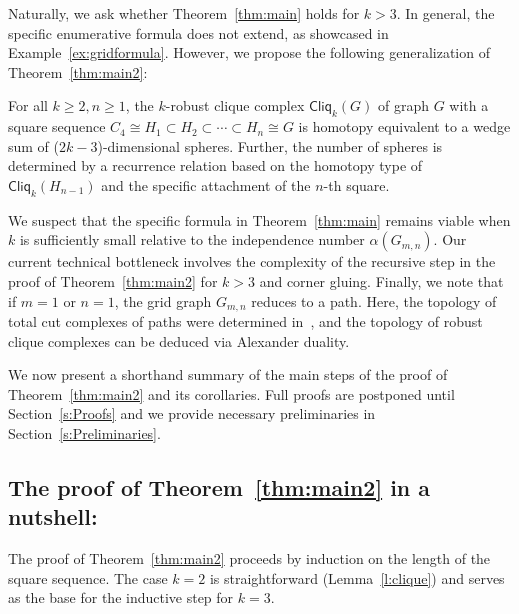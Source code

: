 \documentclass[a4paper, v2021]{lipics-v2021}
\theoremstyle{plain}
\theoremstyle{definition}
\newcommand{\Cliq}[2]{\mathsf{Cliq}_{#1}(#2)}
\DeclarePairedDelimiter{\ceil}{\lceil}{\rceil}
\begin{document}
Naturally, we ask whether Theorem~\ref{thm:main} holds for $k > 3$. In general, the specific enumerative formula does not extend, as showcased in Example~\ref{ex:gridformula}. However, we propose the following generalization of Theorem~\ref{thm:main2}:
\begin{conjecture}
For all $k\geq2,n\geq 1$, the $k$-robust clique complex $\Cliq{k}{G}$ of graph $G$ with a square sequence $C_4 \cong H_1 \subset  H_2 \subset \cdots \subset H_n \cong G$ is homotopy equivalent to a wedge sum of ($2k-3$)-dimensional spheres. Further, the number of spheres  is determined by a recurrence relation based on the homotopy type of $\Cliq{k}{H_{n-1}}$ and the specific attachment of the $n$-th square.
\end{conjecture}
We suspect that the specific formula in Theorem~\ref{thm:main} remains viable when $k$ is sufficiently small relative to the independence number $\alpha(G_{m,n})$. Our current technical bottleneck involves the complexity of the recursive step in the proof of Theorem~\ref{thm:main2} for $k > 3$ and corner gluing. Finally, we note that if $m=1$ or $n=1$, the grid graph $G_{m,n}$ reduces to a path. Here, the topology of total cut complexes of paths were determined in~\cite{BayerDJRSX24}, and the topology of robust clique complexes can be deduced via Alexander duality.

We now present a shorthand summary of the main steps of the proof of Theorem~\ref{thm:main2} and its corollaries. Full proofs are postponed until Section~\ref{s:Proofs} and we provide necessary preliminaries in Section~\ref{s:Preliminaries}. 

\subsection*{The proof of Theorem~\ref{thm:main2} in a nutshell:}
The proof of Theorem~\ref{thm:main2} proceeds by induction on the length of the square sequence. The case $k=2$ is straightforward (Lemma~\ref{l:clique}) and serves as the base for the  inductive step for $k=3$.
\end{document}
